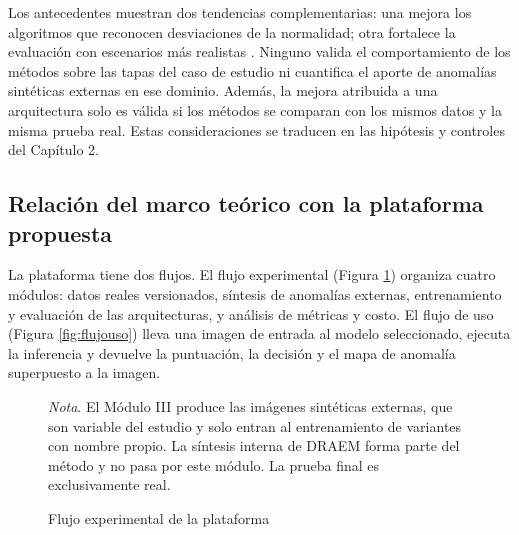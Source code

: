 \documentclass[12pt,oneside]{report}
\renewcommand{\footnotesize}{\fontsize{10}{12}\selectfont}
\newcommand{\nota}[1]{\par\noindent\textit{Nota}. #1\par}
\begin{document}
Los antecedentes muestran dos tendencias complementarias: una mejora los algoritmos que reconocen desviaciones de la normalidad; otra fortalece la evaluación con escenarios más realistas \cite{liu2024}. Ninguno valida el comportamiento de los métodos sobre las tapas del caso de estudio ni cuantifica el aporte de anomalías sintéticas externas en ese dominio. Además, la mejora atribuida a una arquitectura solo es válida si los métodos se comparan con los mismos datos y la misma prueba real. Estas consideraciones se traducen en las hipótesis y controles del Capítulo 2.

\subsection{Relación del marco teórico con la plataforma propuesta}

La plataforma tiene dos flujos. El flujo experimental (Figura \ref{fig:plataforma}) organiza cuatro módulos: datos reales versionados, síntesis de anomalías externas, entrenamiento y evaluación de las arquitecturas, y análisis de métricas y costo. El flujo de uso (Figura \ref{fig:flujouso}) lleva una imagen de entrada al modelo seleccionado, ejecuta la inferencia y devuelve la puntuación, la decisión y el mapa de anomalía superpuesto a la imagen.

\begin{figure}[H]
\caption{Flujo experimental de la plataforma}
\label{fig:plataforma}
\singlespacing
\centering
{}
\par\RaggedRight
\nota{El Módulo III produce las imágenes sintéticas externas, que son variable del estudio y solo entran al entrenamiento de variantes con nombre propio. La síntesis interna de DRAEM forma parte del método y no pasa por este módulo. La prueba final es exclusivamente real.}
\end{figure}
\end{document}
